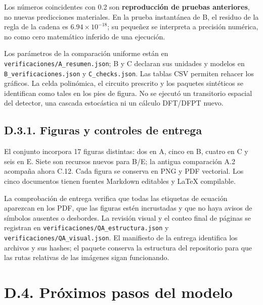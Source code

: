\documentclass[
  spanish,
  10pt,
  a4paper,
]{article}
\begin{document}
Los números coincidentes con 0.2 son \textbf{reproducción de pruebas
anteriores}, no nuevas predicciones materiales. En la prueba instantánea
de B, el residuo de la regla de la cadena es \(6.94\times10^{-18}\); su
pequeñez se interpreta a precisión numérica, no como cero matemático
inferido de una ejecución.

Los parámetros de la comparación uniforme están en
\nolinkurl{verificaciones/A_resumen.json}; B y C declaran sus unidades y
modelos en \nolinkurl{B_verificaciones.json} y \nolinkurl{C_checks.json}.
Las tablas CSV permiten rehacer los gráficos. La celda polinómica, el
circuito prescrito y los paquetes sintéticos se identifican como tales
en los pies de figura. No se ejecutó un transitorio espacial del
detector, una cascada estocástica ni un cálculo DFT/DFPT nuevo.

\subsection{D.3.1. Figuras y controles de
entrega}\label{d.3.1.-figuras-y-controles-de-entrega}

El conjunto incorpora 17 figuras distintas: dos en A, cinco en B, cuatro
en C y seis en E. Siete son recursos nuevos para B/E; la antigua
comparación A.2 acompaña ahora C.12. Cada figura se conserva en PNG y
PDF vectorial. Los cinco documentos tienen fuentes Markdown editables y
LaTeX compilable.

La comprobación de entrega verifica que todas las etiquetas de ecuación
aparezcan en los PDF, que las figuras estén incrustadas y que no haya
avisos de símbolos ausentes o desbordes. La revisión visual y el conteo
final de páginas se registran en
\nolinkurl{verificaciones/QA_estructura.json} y
\nolinkurl{verificaciones/QA_visual.json}. El manifiesto de la entrega
identifica los archivos y sus hashes; el paquete conserva la estructura
del repositorio para que las rutas relativas de las imágenes sigan
funcionando.

\section{D.4. Próximos pasos del
modelo}\label{d.4.-pruxf3ximos-pasos-del-modelo}
\end{document}
